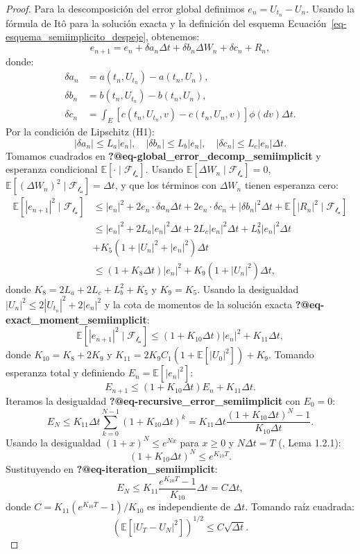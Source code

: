 \documentclass[
  spanish,
  us-letterpaper,
]{scrreprt}
\theoremstyle{plain}
\theoremstyle{plain}
\theoremstyle{definition}
\theoremstyle{remark}
\begin{document}
\begin{proof}
Para la descomposición del error global definimos
\(e_n = U_{t_n} - U_n\). Usando la fórmula de Itô para la solución
exacta y la definición del esquema
Ecuación~\ref{eq-esquema_semiimplicito_despeje}, obtenemos:
\[e_{n+1} = e_n + \delta a_n \Delta t + \delta b_n \Delta W_n + \delta c_n + R_n,\]
donde: \[\begin{aligned}
\delta a_n &= a(t_n, U_{t_n}) - a(t_n, U_n), \\
\delta b_n &= b(t_n, U_{t_n}) - b(t_n, U_n), \\
\delta c_n &= \int_E [c(t_n, U_{t_n}, v) - c(t_n, U_n, v)] \phi(dv) \Delta t.
\end{aligned}\] Por la condición de Lipschitz (H1):
\[|\delta a_n| \leq L_a |e_n|, \quad |\delta b_n| \leq L_b |e_n|, \quad |\delta c_n| \leq L_c |e_n| \Delta t.\]
Tomamos cuadrados en \textbf{?@eq-global\_error\_decomp\_semiimplicit} y
esperanza condicional \(\mathbb{E}[\cdot \mid \mathcal{F_{t_n}}].\)
Usando \(\mathbb{E}[\Delta W_n \mid \mathcal{F_{t_n}}] = 0\),
\(\mathbb{E}[(\Delta W_n)^2 \mid \mathcal{F_{t_n}}] = \Delta t\), y que
los términos con \(\Delta W_n\) tienen esperanza cero: \[\begin{aligned}
\mathbb{E}[|e_{n+1}|^2 \mid \mathcal{F_{t_n}}] 
&\leq |e_n|^2 + 2e_n \cdot \delta a_n \Delta t + 2e_n \cdot \delta c_n + |\delta b_n|^2 \Delta t + \mathbb{E}[|R_n|^2 \mid \mathcal{F_{t_n}}] \nonumber \\
&\leq |e_n|^2 + 2L_a |e_n|^2 \Delta t + 2L_c |e_n|^2 \Delta t + L_b^2 |e_n|^2 \Delta t \\
& + K_5 (1 + |U_n|^2 + |e_n|^2) \Delta t \nonumber \\
&\leq (1 + K_8 \Delta t) |e_n|^2 + K_9 (1 + |U_n|^2) \Delta t,
\end{aligned}\] donde \(K_8 = 2L_a + 2L_c + L_b^2 + K_5\) y
\(K_9 = K_5\). Usando la desigualdad
\(|U_n|^2 \leq 2|U_{t_n}|^2 + 2|e_n|^2\) y la cota de momentos de la
solución exacta \textbf{?@eq-exact\_moment\_semiimplicit}:
\[\mathbb{E}[|e_{n+1}|^2 \mid \mathcal{F_{t_n}}] \leq (1 + K_{10} \Delta t) |e_n|^2 + K_{11} \Delta t,\]
donde \(K_{10} = K_8 + 2K_9\) y
\(K_{11} = 2K_9 C_1 (1 + \mathbb{E}[|U_0|^2]) + K_9\). Tomando esperanza
total y definiendo \(E_n = \mathbb{E}[|e_n|^2]\):
\[E_{n+1} \leq (1 + K_{10} \Delta t) E_n + K_{11} \Delta t.\] Iteramos
la desigualdad \textbf{?@eq-recursive\_error\_semiimplicit} con
\(E_0 = 0\):
\[E_N \leq K_{11} \Delta t \sum_{k=0}^{N-1} (1 + K_{10} \Delta t)^k = K_{11} \Delta t \frac{(1 + K_{10} \Delta t)^N - 1}{K_{10} \Delta t}.\]
Usando la desigualdad \((1 + x)^N \leq e^{Nx}\) para \(x \geq 0\) y
\(N\Delta t = T\) (\textcite{platen2010numerical}, Lema 1.2.1):
\[(1 + K_{10} \Delta t)^N \leq e^{K_{10} T}.\] Sustituyendo en
\textbf{?@eq-iteration\_semiimplicit}:
\[E_N \leq K_{11} \frac{e^{K_{10} T} - 1}{K_{10}} \Delta t = C \Delta t,\]
donde \(C = K_{11} (e^{K_{10} T} - 1)/K_{10}\) es independiente de
\(\Delta t\). Tomando raíz cuadrada:
\[\left( \mathbb{E}[|U_T - U_N|^2] \right)^{1/2} \leq C \sqrt{\Delta t}.\]
\end{proof}
\end{document}
